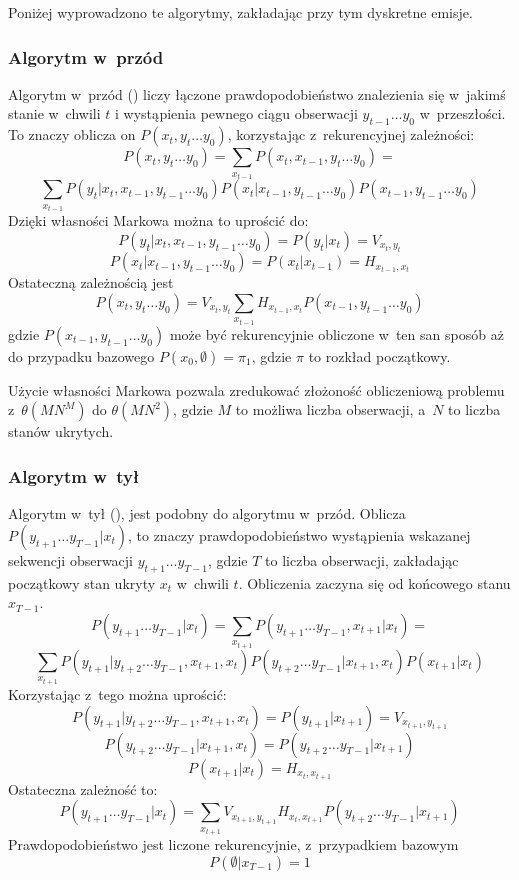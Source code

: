 Poniżej wyprowadzono te algorytmy, zakładając przy tym dyskretne emisje.

\subsubsection{Algorytm w~przód}

Algorytm w~przód () liczy łączone prawdopodobieństwo znalezienia się w~jakimś stanie w~chwili $t$
i wystąpienia pewnego ciągu obserwacji $y_{t-1} \dots y_0$ w~przeszłości. To znaczy oblicza on $P(x_t, y_t \dots y_0)$,
korzystając z~rekurencyjnej zależności:
$$P(x_t, y_t \dots y_0) = \sum_{x_{t-1}} P(x_t, x_{t-1}, y_t \dots y_0) =$$
$$\sum_{x_{t-1}} P(y_t | x_t, x_{t-1}, y_{t-1} \dots y_0) P(x_t | x_{t-1}, y_{t-1} \dots y_0) P(x_{t-1}, y_{t-1} \dots y_0)$$
Dzięki własności Markowa można to uprościć do:
$$P(y_t | x_t, x_{t-1}, y_{t-1} \dots y_0) = P(y_t | x_t) = V_{x_t, y_t}$$
$$P(x_t | x_{t-1}, y_{t-1} \dots y_0) = P(x_t | x_{t-1}) = H_{x_{t-1}, x_t}$$
Ostateczną zależnością jest
$$P(x_t, y_t \dots y_0) = V_{x_t, y_t} \sum_{x_{t-1}} H_{x_{t-1}, x_t} P(x_{t-1}, y_{t-1} \dots y_0)$$
gdzie $P(x_{t-1}, y_{t-1} \dots y_0)$ może być rekurencyjnie obliczone w~ten san sposób aż do przypadku bazowego $P(x_0, \emptyset) = \pi_1$, gdzie $\pi$ to rozkład początkowy.

Użycie własności Markowa pozwala zredukować złożoność obliczeniową problemu z~$\theta(MN^M)$ do $\theta(MN^2)$, gdzie $M$ to możliwa liczba obserwacji, a~$N$ to liczba stanów ukrytych.

\subsubsection{Algorytm w~tył}

Algorytm w~tył (), jest podobny do algorytmu w~przód. Oblicza $P(y_{t+1} \dots y_{T-1} | x_t)$, to znaczy prawdopodobieństwo wystąpienia wskazanej sekwencji obserwacji $y_{t+1} \dots y_{T-1}$, gdzie $T$ to liczba obserwacji, zakładając początkowy stan ukryty $x_t$ w~chwili $t$. Obliczenia zaczyna się od końcowego stanu $x_{T-1}$.
$$P(y_{t+1} \dots y_{T-1} | x_t) = \sum_{x_{t+1}} P(y_{t+1} \dots y_{T-1}, x_{t+1} | x_t) =$$
$$\sum_{x_{t+1}} P(y_{t+1} | y_{t+2} \dots y_{T-1}, x_{t+1}, x_t) P(y_{t+2} \dots y_{T-1} | x_{t+1}, x_t) P(x_{t+1} | x_t)$$
Korzystając z~tego można uprościć:
$$P(y_{t+1} | y_{t+2} \dots y_{T-1}, x_{t+1}, x_t) = P(y_{t+1} | x_{t+1}) = V_{x_{t+1},y_{t+1}}$$
$$P(y_{t+2} \dots y_{T-1} | x_{t+1}, x_t) = P(y_{t+2} \dots y_{T-1} | x_{t+1})$$
$$P(x_{t+1} | x_t) = H_{x_t,x_{t+1}}$$
Ostateczna zależność to:
$$P(y_{t+1} \dots y_{T-1} | x_t) =  \sum_{x_{t+1}} V_{x_{t+1},y_{t+1}} H_{x_t,x_{t+1}} P(y_{t+2} \dots y_{T-1} | x_{t+1})$$
Prawdopodobieństwo jest liczone rekurencyjnie, z~przypadkiem bazowym
$$P(\emptyset | x_{T-1}) = 1$$

